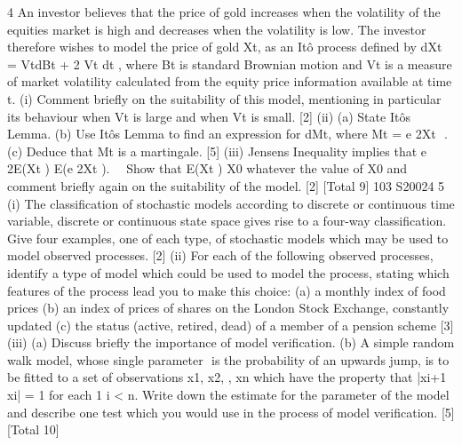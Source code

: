 4 An investor believes that the price of gold increases when the volatility of the equities
market is high and decreases when the volatility is low. The investor therefore wishes
to model the price of gold Xt, as an Itô process defined by dXt = VtdBt + 2
Vt dt , where
Bt is standard Brownian motion and Vt is a measure of market volatility calculated
from the equity price information available at time t.
(i) Comment briefly on the suitability of this model, mentioning in particular its
behaviour when Vt is large and when Vt is small. [2]
(ii) (a) State Itôs Lemma.
(b) Use Itôs Lemma to find an expression for dMt, where Mt = e 2Xt  .
(c) Deduce that Mt is a martingale. [5]
(iii) Jensens Inequality implies that
e 2E(Xt ) E(e 2Xt ).   
Show that E(Xt )  X0 whatever the value of X0 and comment briefly again
on the suitability of the model. [2]
[Total 9]
103 S20024
5 (i) The classification of stochastic models according to discrete or continuous
time variable, discrete or continuous state space gives rise to a four-way
classification. Give four examples, one of each type, of stochastic models
which may be used to model observed processes. [2]
(ii) For each of the following observed processes, identify a type of model which
could be used to model the process, stating which features of the process lead
you to make this choice:
(a) a monthly index of food prices
(b) an index of prices of shares on the London Stock Exchange, constantly
updated
(c) the status (active, retired, dead) of a member of a pension scheme [3]
(iii) (a) Discuss briefly the importance of model verification.
(b) A simple random walk model, whose single parameter  is the
probability of an upwards jump, is to be fitted to a set of observations
{x1, x2, , xn} which have the property that |xi+1  xi| = 1 for each 1 
 i
< n. Write down the estimate for the parameter of the model and
describe one test which you would use in the process of model
verification. [5]
[Total 10]



